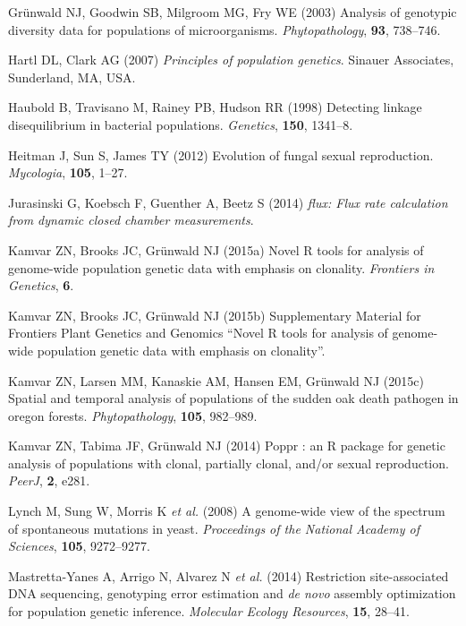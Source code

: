 \documentclass[]{article}
\theoremstyle{definition}
\theoremstyle{definition}
\theoremstyle{remark}
\begin{document}
\hypertarget{ref-grunwald2003analysis}{}
Grünwald NJ, Goodwin SB, Milgroom MG, Fry WE (2003) Analysis of
genotypic diversity data for populations of microorganisms.
\emph{Phytopathology}, \textbf{93}, 738--746.

\hypertarget{ref-hartl1997principles}{}
Hartl DL, Clark AG (2007) \emph{Principles of population genetics}.
Sinauer Associates, Sunderland, MA, USA.

\hypertarget{ref-haubold1998detecting}{}
Haubold B, Travisano M, Rainey PB, Hudson RR (1998) Detecting linkage
disequilibrium in bacterial populations. \emph{Genetics}, \textbf{150},
1341--8.

\hypertarget{ref-heitman2012evolution}{}
Heitman J, Sun S, James TY (2012) Evolution of fungal sexual
reproduction. \emph{Mycologia}, \textbf{105}, 1--27.

\hypertarget{ref-jurasinski2014flux}{}
Jurasinski G, Koebsch F, Guenther A, Beetz S (2014) \emph{flux: Flux
rate calculation from dynamic closed chamber measurements}.

\hypertarget{ref-kamvar2015novel}{}
Kamvar ZN, Brooks JC, Grünwald NJ (2015a) Novel R tools for analysis of
genome-wide population genetic data with emphasis on clonality.
\emph{Frontiers in Genetics}, \textbf{6}.

\hypertarget{ref-kamvar2015poppr2supp}{}
Kamvar ZN, Brooks JC, Grünwald NJ (2015b) Supplementary Material for
Frontiers Plant Genetics and Genomics ``Novel R tools for analysis of
genome-wide population genetic data with emphasis on clonality''.

\hypertarget{ref-kamvar2015spatial}{}
Kamvar ZN, Larsen MM, Kanaskie AM, Hansen EM, Grünwald NJ (2015c)
Spatial and temporal analysis of populations of the sudden oak death
pathogen in oregon forests. \emph{Phytopathology}, \textbf{105},
982--989.

\hypertarget{ref-kamvar2014poppr}{}
Kamvar ZN, Tabima JF, Grünwald NJ (2014) Poppr : an R package for
genetic analysis of populations with clonal, partially clonal, and/or
sexual reproduction. \emph{PeerJ}, \textbf{2}, e281.

\hypertarget{ref-lynch2008genome}{}
Lynch M, Sung W, Morris K \emph{et al.} (2008) A genome-wide view of the
spectrum of spontaneous mutations in yeast. \emph{Proceedings of the
National Academy of Sciences}, \textbf{105}, 9272--9277.

\hypertarget{ref-mastretta2015restriction}{}
Mastretta-Yanes A, Arrigo N, Alvarez N \emph{et al.} (2014) Restriction
site-associated DNA sequencing, genotyping error estimation and \emph{de
novo} assembly optimization for population genetic inference.
\emph{Molecular Ecology Resources}, \textbf{15}, 28--41.
\end{document}
